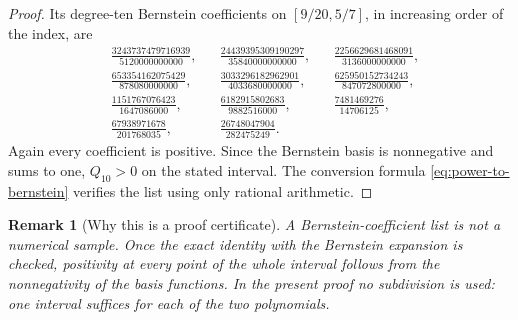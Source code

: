 \documentclass[11pt]{article}
\newtheorem{remark}[theorem]{Remark}
\numberwithin{equation}{section}
\begin{document}
\begin{proof}
  Its degree-ten Bernstein coefficients on $[9/20,5/7]$, in increasing
  order of the index, are
  \begin{align*}
    &\frac{3243737479716939}{5120000000000},
    &&\frac{24439395309190297}{35840000000000},
    &&\frac{2256629681468091}{3136000000000},\\[1mm]
    &\frac{653354162075429}{878080000000},
    &&\frac{3033296182962901}{4033680000000},
    &&\frac{625950152734243}{847072800000},\\[1mm]
    &\frac{1151767076423}{1647086000},
    &&\frac{6182915802683}{9882516000},
    &&\frac{7481469276}{14706125},\\[1mm]
    &\frac{67938971678}{201768035},
    &&\frac{26748047904}{282475249}.
  \end{align*}
  Again every coefficient is positive.  Since the Bernstein basis is
  nonnegative and sums to one, $Q_{10}>0$ on the stated interval.
  The conversion formula \eqref{eq:power-to-bernstein} verifies the list using
  only rational arithmetic.
\end{proof}

\begin{remark}[Why this is a proof certificate]
  A Bernstein-coefficient list is not a numerical sample.  Once the exact
  identity with the Bernstein expansion is checked, positivity at every point
  of the whole interval follows from the nonnegativity of the basis functions.
  In the present proof no subdivision is used: one interval suffices for each
  of the two polynomials.
\end{remark}
\end{document}
